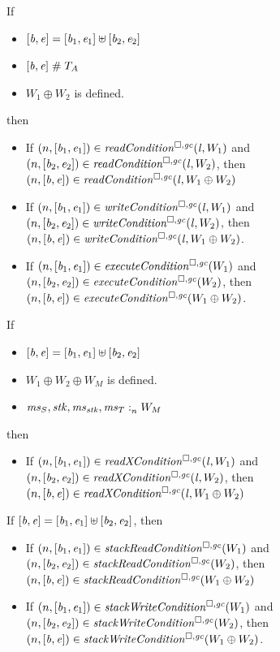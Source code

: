 \documentclass[a4paper]{article}
\begin{document}
\begin{lemma}
  \label{lem:conds-splicable}
  If
  \begin{itemize}
  \item $[\mathit{b},\mathit{e}] = [\mathit{b}_1,\mathit{e}_1] \uplus [\mathit{b}_2,\mathit{e}_2]$
  \item $[\mathit{b},\mathit{e}]\mathrel{\#} T_{A}$
  \item $W_1\oplus W_2$ is defined.
  \end{itemize}
  then
  \begin{itemize}
  \item If $\npair{[\baddr_1,\eaddr_1]} \in \readCond{\lin,W_1}$ and $\npair{[\baddr_2,\eaddr_2]} \in \readCond{\lin,W_2}$, then $\npair{[\baddr,\eaddr]} \in \readCond{\lin,W_1 \oplus W_2}$
  \item If $\npair{[\baddr_1,\eaddr_1]} \in \writeCond{\lin,W_1}$ and $\npair{[\baddr_2,\eaddr_2]} \in \writeCond{\lin,W_2}$, then $\npair{[\baddr,\eaddr]} \in \writeCond{\lin,W_1 \oplus W_2}$.
  \item If $\npair{[\baddr_1,\eaddr_1]} \in \execCond{W_1}$ and $\npair{[\baddr_2,\eaddr_2]} \in \execCond{W_2}$, then $\npair{[\baddr,\eaddr]} \in \execCond{W_1 \oplus W_2}$.
  \end{itemize}

  If
  \begin{itemize}
  \item $[\mathit{b},\mathit{e}] = [\mathit{b}_1,\mathit{e}_1] \uplus [\mathit{b}_2,\mathit{e}_2]$
  \item $W_1\oplus W_2 \oplus W_M$ is defined.
  \item $\mathit{ms}_S,\mathit{stk},\mathit{ms}_{\mathit{stk}},\mathit{ms}_T :_{n}^{}W_M$
  \end{itemize}
  then
  \begin{itemize}
  \item If $\npair{[\baddr_1,\eaddr_1]} \in \xReadCond{\lin,W_1}$ and
    $\npair{[\baddr_2,\eaddr_2]} \in \xReadCond{\lin,W_2}$, then
    $\npair{[\baddr,\eaddr]} \in \xReadCond{\lin,W_1 \oplus W_2}$
  \end{itemize}

  If $[\mathit{b},\mathit{e}] = [\mathit{b}_1,\mathit{e}_1] \uplus [\mathit{b}_2,\mathit{e}_2]$, then
  \begin{itemize}
  \item If $\npair{[\baddr_1,\eaddr_1]} \in \stackReadCond{W_1}$ and $\npair{[\baddr_2,\eaddr_2]} \in \stackReadCond{W_2}$, then $\npair{[\baddr,\eaddr]} \in \stackReadCond{W_1 \oplus W_2}$
  \item If $\npair{[\baddr_1,\eaddr_1]} \in \stackWriteCond{W_1}$ and $\npair{[\baddr_2,\eaddr_2]} \in \stackWriteCond{W_2}$, then $\npair{[\baddr,\eaddr]} \in \stackWriteCond{W_1 \oplus W_2}$.
  \end{itemize}
\end{lemma}
\end{document}

